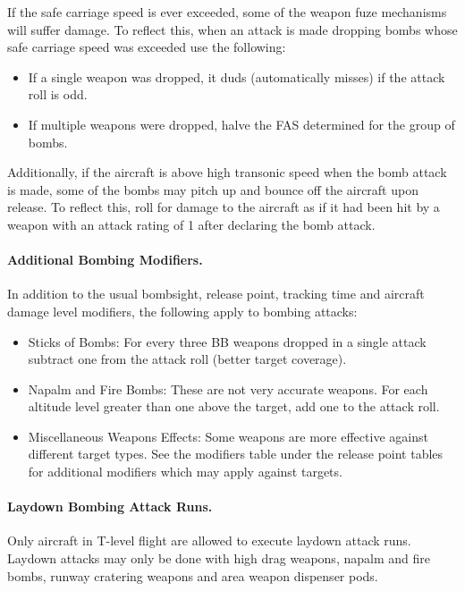 If the safe carriage speed is ever exceeded, some of the weapon fuze mechanisms will suffer damage. To reflect this, when an attack is made dropping bombs whose safe carriage speed was exceeded use the following:

\begin{itemize}
    \item If a single weapon was dropped, it duds (automatically misses) if the attack roll is odd.
    \item If multiple weapons were dropped, halve the FAS determined for the group of bombs.
\end{itemize}

Additionally, if the aircraft is above high transonic speed when the bomb attack is made, some of the bombs may pitch up and bounce off the aircraft upon release. To reflect this, roll for damage to the aircraft as if it had been hit by a weapon with an attack rating of 1 after declaring the bomb attack.

\paragraph{Additional Bombing Modifiers.} In addition to the usual bombsight, release point, tracking time and aircraft damage level modifiers, the following apply to bombing attacks:

\begin{itemize}
    \item Sticks of Bombs: For every three BB weapons dropped in a single attack subtract one from the attack roll (better target coverage).

    \item Napalm and Fire Bombs: These are not very accurate weapons. For each altitude level greater than one above the target, add one to the attack roll.

    \item Miscellaneous Weapons Effects: Some weapons are more effective against different target types. See the modifiers table under the release point tables for additional modifiers which may apply against targets.
\end{itemize}

\paragraph{Laydown Bombing Attack Runs.} Only aircraft in T-level flight are allowed to execute laydown attack runs. Laydown attacks may only be done with high drag weapons, napalm and fire bombs, runway cratering weapons and area weapon dispenser pods.

